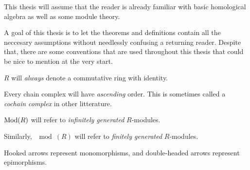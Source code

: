 This thesis will assume that the reader is already familiar with basic homological algebra as well as some module theory.

A goal of this thesis is to let the theorems and definitions contain all the neccesary assumptions without needlessly confusing a returning reader. Despite that, there are some conventions that are used throughout this thesis that could be nice to mention at the very start.

\begin{notation}
    \( R \) will \emph{always} denote a commutative ring with identity.
\end{notation}

\begin{notation}
    Every chain complex will have \emph{ascending} order. This is sometimes called a \emph{cochain complex} in other litterature.
\end{notation}

\begin{notation}
    \( \operatorname{Mod}(R) \) will refer to \emph{infinitely generated} \( R \)-modules.

    Similarly, \( \mod(R) \) will refer to \emph{finitely generated} \( R \)-modules.
\end{notation}

\begin{notation}
    Hooked arrows represent monomorphisms, and double-headed arrows represent epimorphisms.
\end{notation}